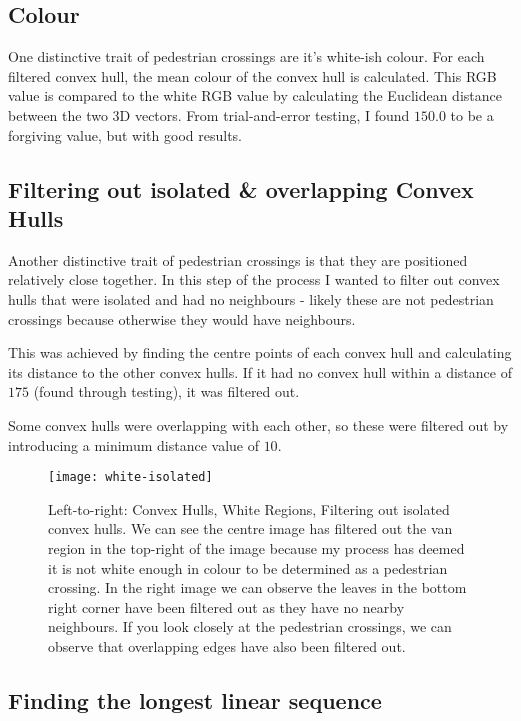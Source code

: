 \documentclass{article}  %
\begin{document}
	\subsection{Colour}
	
	One distinctive trait of pedestrian crossings are it's white-ish colour. For each filtered convex hull, the mean colour of the convex hull is calculated. This RGB value is compared to the white RGB value by calculating the Euclidean distance between the two 3D vectors. From trial-and-error testing, I found $150.0$ to be a forgiving value, but with good results.
	
	\subsection{Filtering out isolated \& overlapping Convex Hulls}
	
	Another distinctive trait of pedestrian crossings is that they are positioned relatively close together. In this step of the process I wanted to filter out convex hulls that were isolated and had no neighbours - likely these are not pedestrian crossings because otherwise they would have neighbours.
	
	This was achieved by finding the centre points of each convex hull and calculating its distance to the other convex hulls. If it had no convex hull within a distance of $175$ (found through testing), it was filtered out.
	
	Some convex hulls were overlapping with each other, so these were filtered out by introducing a minimum distance value of $10$.
	
	\begin{figure}[H]
		\centering
		\texttt{[image: white-isolated]}
		\caption{Left-to-right: Convex Hulls, White Regions, Filtering out isolated convex hulls. We can see the centre image has filtered out the van region in the top-right of the image because my process has deemed it is not white enough in colour to be determined as a pedestrian crossing. In the right image we can observe the leaves in the bottom right corner have been filtered out as they have no nearby neighbours. If you look closely at the pedestrian crossings, we can observe that overlapping edges have also been filtered out.}
	\end{figure}
	
	\subsection{Finding the longest linear sequence}
	
\end{document}
